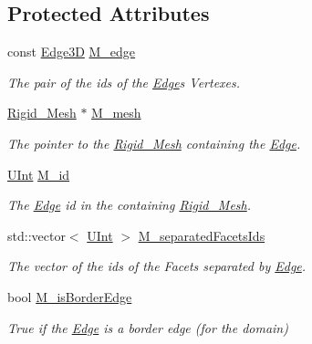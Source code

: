\subsection*{Protected Attributes}
\begin{DoxyCompactItemize}
\item 
const \hyperlink{classFVCode3D_1_1Rigid__Mesh_a396039ac2943822c4652967ce1849c9f}{Edge3D} \hyperlink{classFVCode3D_1_1Rigid__Mesh_1_1Edge_af8573366715c188a54326703bbf90e72}{M\+\_\+edge}
\begin{DoxyCompactList}\small\item\em The pair of the ids of the \hyperlink{classFVCode3D_1_1Rigid__Mesh_1_1Edge}{Edge}\textquotesingle{}s Vertexes. \end{DoxyCompactList}\item 
\hyperlink{classFVCode3D_1_1Rigid__Mesh}{Rigid\+\_\+\+Mesh} $\ast$ \hyperlink{classFVCode3D_1_1Rigid__Mesh_1_1Edge_a64bb5c3aa3654d3234f555da2414f3b5}{M\+\_\+mesh}
\begin{DoxyCompactList}\small\item\em The pointer to the \hyperlink{classFVCode3D_1_1Rigid__Mesh}{Rigid\+\_\+\+Mesh} containing the \hyperlink{classFVCode3D_1_1Rigid__Mesh_1_1Edge}{Edge}. \end{DoxyCompactList}\item 
\hyperlink{namespaceFVCode3D_a4bf7e328c75d0fd504050d040ebe9eda}{U\+Int} \hyperlink{classFVCode3D_1_1Rigid__Mesh_1_1Edge_a534f18f2319df147a43ee837d41dddfe}{M\+\_\+id}
\begin{DoxyCompactList}\small\item\em The \hyperlink{classFVCode3D_1_1Rigid__Mesh_1_1Edge}{Edge} id in the containing \hyperlink{classFVCode3D_1_1Rigid__Mesh}{Rigid\+\_\+\+Mesh}. \end{DoxyCompactList}\item 
std\+::vector$<$ \hyperlink{namespaceFVCode3D_a4bf7e328c75d0fd504050d040ebe9eda}{U\+Int} $>$ \hyperlink{classFVCode3D_1_1Rigid__Mesh_1_1Edge_a4fd7d85c6c2a87a784ac65618785faf5}{M\+\_\+separated\+Facets\+Ids}
\begin{DoxyCompactList}\small\item\em The vector of the ids of the Facets separated by \hyperlink{classFVCode3D_1_1Rigid__Mesh_1_1Edge}{Edge}. \end{DoxyCompactList}\item 
bool \hyperlink{classFVCode3D_1_1Rigid__Mesh_1_1Edge_af97600008d97c4db6f57fba531d8cd5c}{M\+\_\+is\+Border\+Edge}
\begin{DoxyCompactList}\small\item\em True if the \hyperlink{classFVCode3D_1_1Rigid__Mesh_1_1Edge}{Edge} is a border edge (for the domain) \end{DoxyCompactList}\item 

\end{DoxyCompactItemize}
